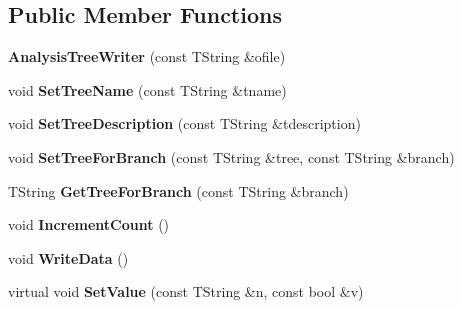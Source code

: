 \subsection*{Public Member Functions}
\begin{DoxyCompactItemize}
\item 
\hypertarget{class_h_a_l_1_1_analysis_tree_writer_a84bd5498078ffc6e67d5265b907705d5}{{\bfseries Analysis\+Tree\+Writer} (const T\+String \&ofile)}\label{class_h_a_l_1_1_analysis_tree_writer_a84bd5498078ffc6e67d5265b907705d5}

\item 
\hypertarget{class_h_a_l_1_1_analysis_tree_writer_a54d51c4078ebaeedd2ce02ac73945a78}{void {\bfseries Set\+Tree\+Name} (const T\+String \&tname)}\label{class_h_a_l_1_1_analysis_tree_writer_a54d51c4078ebaeedd2ce02ac73945a78}

\item 
\hypertarget{class_h_a_l_1_1_analysis_tree_writer_aec457c9a3f813a0ed455e1e4933ddb7f}{void {\bfseries Set\+Tree\+Description} (const T\+String \&tdescription)}\label{class_h_a_l_1_1_analysis_tree_writer_aec457c9a3f813a0ed455e1e4933ddb7f}

\item 
\hypertarget{class_h_a_l_1_1_analysis_tree_writer_a7e27d118b04eeba4c7fe66185c07434b}{void {\bfseries Set\+Tree\+For\+Branch} (const T\+String \&tree, const T\+String \&branch)}\label{class_h_a_l_1_1_analysis_tree_writer_a7e27d118b04eeba4c7fe66185c07434b}

\item 
\hypertarget{class_h_a_l_1_1_analysis_tree_writer_a91582d11e58a4b8d84d4ff35123a3ad3}{T\+String {\bfseries Get\+Tree\+For\+Branch} (const T\+String \&branch)}\label{class_h_a_l_1_1_analysis_tree_writer_a91582d11e58a4b8d84d4ff35123a3ad3}

\item 
\hypertarget{class_h_a_l_1_1_analysis_tree_writer_a2bc77354335ee48351205af7804356fc}{void {\bfseries Increment\+Count} ()}\label{class_h_a_l_1_1_analysis_tree_writer_a2bc77354335ee48351205af7804356fc}

\item 
\hypertarget{class_h_a_l_1_1_analysis_tree_writer_af49d85d3524d21a7da1a27d0a029239d}{void {\bfseries Write\+Data} ()}\label{class_h_a_l_1_1_analysis_tree_writer_af49d85d3524d21a7da1a27d0a029239d}

\item 
\hypertarget{class_h_a_l_1_1_analysis_tree_writer_af8dfdc6182004a8931d9c0f8926ae330}{virtual void {\bfseries Set\+Value} (const T\+String \&n, const bool \&v)}\label{class_h_a_l_1_1_analysis_tree_writer_af8dfdc6182004a8931d9c0f8926ae330}


\end{DoxyCompactItemize}
